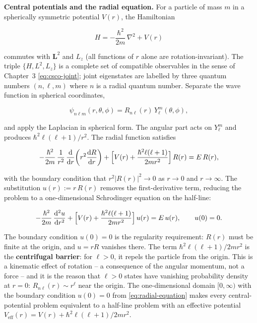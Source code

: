 \medskip\noindent\textbf{Central potentials and the radial equation.}
For a particle of mass $m$ in a spherically symmetric potential $V(r)$, the Hamiltonian
\begin{linenomath}
  \begin{equation}
    H = -\frac{\hbar^2}{2m}\,\nabla^2 + V(r)
  \end{equation}
\end{linenomath}
commutes with $\bm L^2$ and $L_z$ (all functions of $r$ alone are rotation-invariant). The triple $\{H, L^2, L_z\}$ is a complete set of compatible observables in the sense of Chapter~3 \eqref{eq:csco-joint}; joint eigenstates are labelled by three quantum numbers $(n,\ell,m)$ where $n$ is a radial quantum number. Separate the wave function in spherical coordinates,
\begin{linenomath}
  \begin{equation}
    \psi_{n\ell m}(r,\theta,\phi) = R_{n\ell}(r)\,Y_\ell^m(\theta,\phi),
  \end{equation}
\end{linenomath}
and apply the Laplacian in spherical form. The angular part acts on $Y_\ell^m$ and produces $\hbar^2\ell(\ell+1)/r^2$. The radial function satisfies
\begin{linenomath}
  \begin{equation}
    -\frac{\hbar^2}{2m}\,
    \frac{1}{r^2}\,\frac{\mathrm{d}}{\mathrm{d} r}\!\left(r^2\frac{\mathrm{d} R}{\mathrm{d} r}\right)
    + \Bigl[V(r) + \frac{\hbar^2\ell(\ell+1)}{2mr^2}\Bigr]\,R(r)
    = E\,R(r),
    \label{eq:radial-equation}
  \end{equation}
\end{linenomath}
with the boundary condition that $r^2|R(r)|^2 \to 0$ as $r \to 0$ and $r \to \infty$. The substitution $u(r) := r\,R(r)$ removes the first-derivative term, reducing the problem to a one-dimensional Schrodinger equation on the half-line:
\begin{linenomath}
  \begin{equation}
    -\frac{\hbar^2}{2m}\,\frac{\mathrm{d}^2 u}{\mathrm{d} r^2}
    + \Bigl[V(r) + \frac{\hbar^2\ell(\ell+1)}{2mr^2}\Bigr]\,u(r)
    = E\,u(r),
    \qquad
    u(0) = 0.
  \end{equation}
\end{linenomath}
The boundary condition $u(0) = 0$ is the regularity requirement: $R(r)$ must be finite at the origin, and $u = rR$ vanishes there. The term $\hbar^2\ell(\ell+1)/2mr^2$ is the \textbf{centrifugal barrier}: for $\ell > 0$, it repels the particle from the origin. This is a kinematic effect of rotation -- a consequence of the angular momentum, not a force -- and it is the reason that $\ell > 0$ states have vanishing probability density at $r = 0$: $R_{n\ell}(r) \sim r^\ell$ near the origin. The one-dimensional domain $[0,\infty)$ with the boundary condition $u(0)=0$ from \eqref{eq:radial-equation} makes every central-potential problem equivalent to a half-line problem with an effective potential $V_{\text{eff}}(r) = V(r) + \hbar^2\ell(\ell+1)/2mr^2$.

